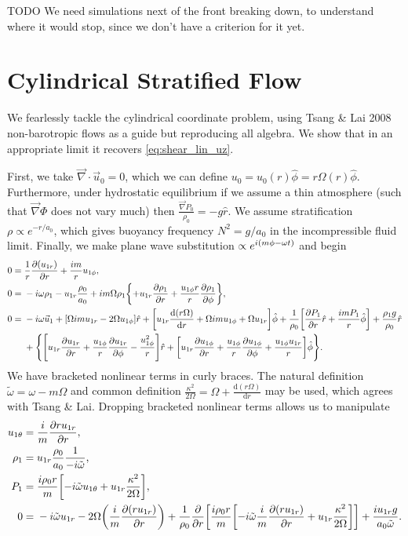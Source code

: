 \documentclass[11pt,
        usenames, %
        dvipsnames %
    ]{report}
\newcommand*{\rd}[2]{\frac{\mathrm{d}#1}{\mathrm{d}#2}}
\newcommand*{\pd}[2]{\frac{\partial#1}{\partial#2}}
\DeclarePairedDelimiter\p{\lparen}{\rparen}
\DeclarePairedDelimiter\s{\lbrack}{\rbrack}
\DeclarePairedDelimiter\z{\lbrace}{\rbrace}
\begin{document}
TODO We need simulations next of the front breaking down, to understand where it
would stop, since we don't have a criterion for it yet.

\chapter{Cylindrical Stratified Flow}

We fearlessly tackle the cylindrical coordinate problem, using Tsang \& Lai 2008
non-barotropic flows as a guide but reproducing all algebra. We show that in an
appropriate limit it recovers \autoref{eq:shear_lin_uz}.

First, we take $\vec{\nabla} \cdot \vec{u}_0 = 0$, which we can define $u_0 =
u_0(r)\hat{\phi} = r\Omega(r) \hat{\phi}$. Furthermore, under hydrostatic
equilibrium if we assume a thin atmosphere (such that $\vec{\nabla}\Phi$ does
not vary much) then $\frac{\vec{\nabla}P_0}{\rho_0} = -g\hat{r}$. We assume
stratification $\rho \propto e^{-r/a_0}$, which gives buoyancy frequency $N^2 =
g/a_0$ in the incompressible fluid limit. Finally, we make plane wave
substitution $\propto e^{i\p*{m\phi - \omega t}}$ and begin
\begin{align}
    0 ={}& \frac{1}{r}\pd{\p*{u_{1r}}}{r} + \frac{im}{r}u_{1\phi},\\
    0 ={}& -i\omega \rho_1 - u_{1r}\frac{\rho_0}{a_0} + im\Omega\rho_1
        \z*{+ u_{1r}\pd{\rho_1}{r} + \frac{u_{1\phi}r}{r}\pd{\rho_1}{\phi}}
            ,\\
    0 ={}& -i\omega \vec{u}_1
            + \s*{\Omega im u_{1r} - 2\Omega u_{1\phi}} \hat{r}
            +\s*{u_{1r}\rd{\p*{r\Omega}}{r} + \Omega imu_{1\phi}
                + \Omega u_{1r}}\hat{\phi}
            + \frac{1}{\rho_0}\s*{\pd{P_1}{r}\hat{r} + \frac{imP_1}{r}
                \hat{\phi}} + \frac{\rho_1 g}{\rho_0}\hat{r}\nonumber\\
        &+ \z*{\s*{u_{1r}\pd{u_{1r}}{r} + \frac{u_{1\phi}}{r}
            \pd{u_{1r}}{\phi} - \frac{u_{1\phi}^2}{r}}\hat{r}
            + \s*{u_{1r}\pd{u_{1\phi}}{r}
                + \frac{u_{1\phi}}{r}\pd{u_{1\phi}}{\phi}
                + \frac{u_{1\phi} u_{1r}}{r}}\hat{\phi}}.
\end{align}
We have bracketed nonlinear terms in curly braces. The natural definition
$\tilde{\omega} = \omega - m\Omega$ and common definition $\frac{\kappa^2}{2\Omega}
= \Omega + \rd{(r\Omega)}{r}$ may be used, which agrees with Tsang \& Lai.
Dropping bracketed nonlinear terms allows us to manipulate
\begin{align}
    u_{1\theta} ={}& \frac{i}{m} \pd{ru_{1r}}{r},\\
    \rho_1 ={}& u_{1r}\frac{\rho_0}{a_0}\frac{1}{-i\tilde{\omega}},\\
    P_1 ={}& \frac{i\rho_0 r}{m}\s*{-i\tilde{\omega}u_{1\theta}
        + u_{1r}\frac{\kappa^2}{2\Omega}},\\
    0 ={}& -i\tilde{\omega}u_{1r} - 2\Omega\p*{\frac{i}{m}\pd{(ru_{1r})}{r}}
        + \frac{1}{\rho_0}\pd{}{r}\s*{\frac{i\rho_0 r}{m}\s*{
            -i\tilde{\omega} \frac{i}{m}\pd{(ru_{1r})}{r}
            +u_{1r}\frac{\kappa^2}{2\Omega}}}
        + \frac{iu_{1r}g}{a_0\tilde{\omega}}.
\end{align}
\end{document}
